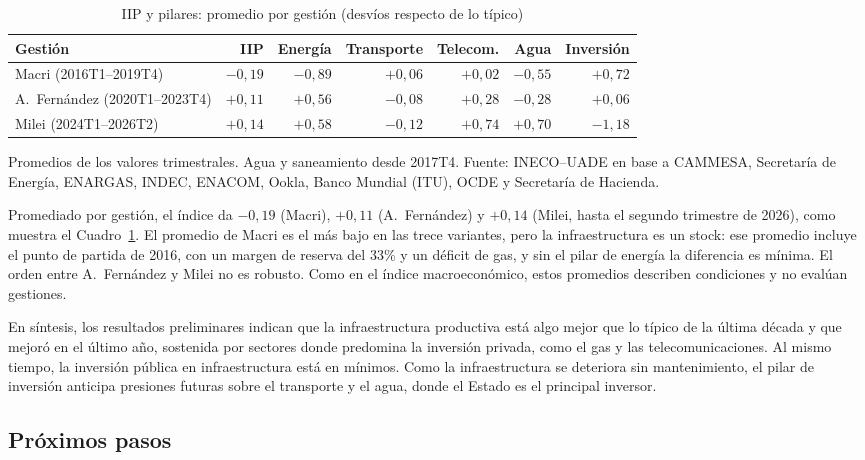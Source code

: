 \begin{table}[!htb]
\centering
\small
\caption{IIP y pilares: promedio por gestión (desvíos respecto de lo típico)}
\vspace{.25 cm}
\label{tab:iip_gestiones}
\begin{tabular}{@{}l r r r r r r@{}}
\toprule
Gestión & IIP & Energía & Transporte & Telecom. & Agua & Inversión \\
\midrule
Macri (2016T1--2019T4)        & $-0{,}19$ & $-0{,}89$ & $+0{,}06$ & $+0{,}02$ & $-0{,}55$ & $+0{,}72$ \\
A.~Fernández (2020T1--2023T4) & $+0{,}11$ & $+0{,}56$ & $-0{,}08$ & $+0{,}28$ & $-0{,}28$ & $+0{,}06$ \\
Milei (2024T1--2026T2)        & $+0{,}14$ & $+0{,}58$ & $-0{,}12$ & $+0{,}74$ & $+0{,}70$ & $-1{,}18$ \\
\bottomrule
\end{tabular}

\smallskip
\parbox{13.5cm}{\footnotesize Promedios de los valores trimestrales. Agua y saneamiento desde 2017T4. Fuente: INECO--UADE en base a CAMMESA, Secretaría de Energía, ENARGAS, INDEC, ENACOM, Ookla, Banco Mundial (ITU), OCDE y Secretaría de Hacienda.}
\end{table}

Promediado por gestión, el índice da $-0{,}19$ (Macri), $+0{,}11$ (A.~Fernández) y $+0{,}14$ (Milei, hasta el segundo trimestre de 2026), como muestra el Cuadro~\ref{tab:iip_gestiones}. El promedio de Macri es el más bajo en las trece variantes, pero la infraestructura es un stock: ese promedio incluye el punto de partida de 2016, con un margen de reserva del 33\% y un déficit de gas, y sin el pilar de energía la diferencia es mínima. El orden entre A.~Fernández y Milei no es robusto. Como en el índice macroeconómico, estos promedios describen condiciones y no evalúan gestiones.

En síntesis, los resultados preliminares indican que la infraestructura productiva está algo mejor que lo típico de la última década y que mejoró en el último año, sostenida por sectores donde predomina la inversión privada, como el gas y las telecomunicaciones. Al mismo tiempo, la inversión pública en infraestructura está en mínimos. Como la infraestructura se deteriora sin mantenimiento, el pilar de inversión anticipa presiones futuras sobre el transporte y el agua, donde el Estado es el principal inversor.

\subsection{Próximos pasos}


